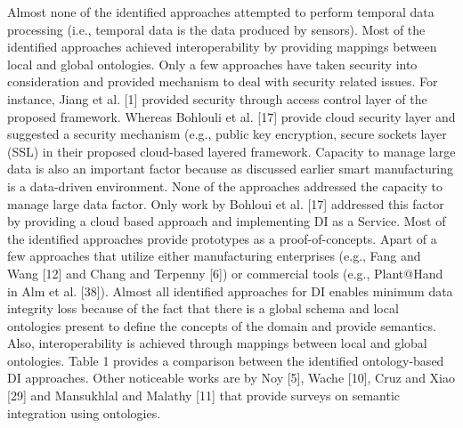 Almost none of the identified approaches attempted to perform temporal data processing (i.e., temporal data is the data produced by sensors). Most of the identified approaches achieved interoperability by providing mappings between local and global ontologies. Only a few approaches have taken security into consideration and provided mechanism to deal with security related issues. For instance, Jiang et al. [1] provided security through access control layer of the proposed framework. Whereas Bohlouli et al. [17] provide cloud security layer and suggested a security mechanism (e.g., public key encryption, secure sockets layer (SSL) in their proposed cloud-based layered framework. Capacity to manage large data is also an important factor because as discussed earlier smart manufacturing is a data-driven environment. None of the approaches addressed the capacity to manage large data factor. Only work by Bohloui et al. [17] addressed this factor by providing a cloud based approach and implementing DI as a Service. 
Most of the identified approaches provide prototypes as a proof-of-concepts. Apart of a few approaches that utilize either manufacturing enterprises (e.g., Fang and Wang [12] and Chang and Terpenny [6]) or commercial tools (e.g., Plant@Hand in Alm et al. [38]). Almost all identified approaches for DI enables minimum data integrity loss because of the fact that there is a global schema and local ontologies present to define the concepts of the domain and provide semantics. Also, interoperability is achieved through mappings between local and global ontologies. Table 1 provides a comparison between the identified ontology-based DI approaches. 
Other noticeable works are by Noy [5], Wache [10], Cruz and Xiao [29] and Mansukhlal and Malathy [11] that provide surveys on semantic integration using ontologies.
